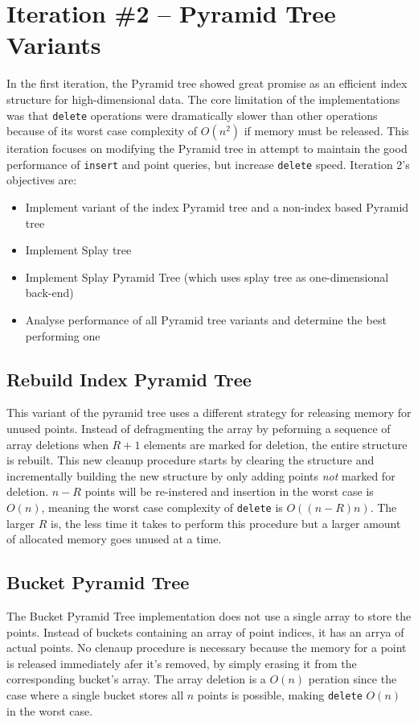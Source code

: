 \section{Iteration \#2 -- Pyramid Tree Variants}

In the first iteration, the Pyramid tree showed great promise as an efficient index structure for high-dimensional data. The core limitation of the implementations was that \texttt{delete} operations were dramatically slower than other operations because of its worst case complexity of $O(n^2)$ if memory must be released. This iteration focuses on modifying the Pyramid tree in attempt to maintain the good performance of \texttt{insert} and point queries, but increase \texttt{delete} speed. Iteration 2's objectives are:
\begin{itemize}
	\item Implement variant of the index Pyramid tree and a non-index based Pyramid tree
	\item Implement Splay tree
	\item Implement Splay Pyramid Tree (which uses splay tree as one-dimensional back-end)
	\item Analyse performance of all Pyramid tree variants and determine the best performing one
\end{itemize}

\subsection{Rebuild Index Pyramid Tree}

This variant of the pyramid tree uses a different strategy for releasing memory for unused points. Instead of defragmenting the array by peforming a sequence of array deletions when $R + 1$ elements are marked for deletion, the entire structure is rebuilt. This new cleanup procedure starts by clearing the structure and incrementally building the new structure by only adding points \textit{not} marked for deletion. $n - R$ points will be re-instered and insertion in the worst case is $O(n)$, meaning the worst case complexity of \texttt{delete} is $O((n - R)n)$. The larger $R$ is, the less time it takes to perform this procedure but a larger amount of allocated memory goes unused at a time.

\subsection{Bucket Pyramid Tree}

The Bucket Pyramid Tree implementation does not use a single array to store the points. Instead of buckets containing an array of point indices, it has an arrya of actual points. No clenaup procedure is necessary because the memory for a point is released immediately afer it's removed, by simply erasing it from the corresponding bucket's array. The array deletion is a $O(n)$ peration since the case where a single bucket stores all $n$ points is possible, making \texttt{delete} $O(n)$ in the worst case.

